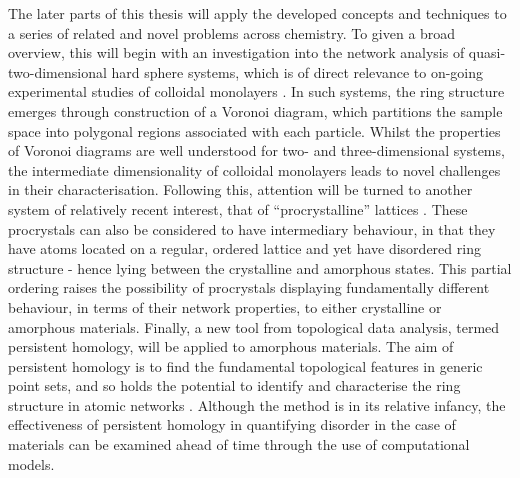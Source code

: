 The later parts of this thesis will apply the developed concepts and techniques to a series of related and novel problems across chemistry.
To given a broad overview, this will begin with an investigation into the network analysis of quasi\--two\--dimensional hard sphere systems, which is of direct relevance to on\--going experimental studies of colloidal monolayers \cite{Thorneywork2017}.
In such systems, the ring structure emerges through construction of a Voronoi diagram, which partitions the sample space into polygonal regions associated with each particle.
Whilst the properties of Voronoi diagrams are well understood for two\-- and three\--dimensional systems, the intermediate dimensionality of colloidal monolayers leads to novel challenges in their characterisation.
Following this, attention will be turned to another system of relatively recent interest, that of ``procrystalline'' lattices \cite{Overy2016}.
These procrystals can also be considered to have intermediary behaviour, in that they have atoms located on a regular, ordered lattice and yet have disordered ring structure - hence lying between the crystalline and amorphous states.
This partial ordering raises the possibility of procrystals displaying fundamentally different behaviour, in terms of their network properties, to either crystalline or amorphous materials.
Finally, a new tool from topological data analysis, termed persistent homology, will be applied to \td{} amorphous materials.
The aim of persistent homology is to find the fundamental topological features in generic point sets, and so holds the potential to identify and characterise the ring structure in atomic networks \cite{Wasserman2018}.
Although the method is in its relative infancy, the effectiveness of persistent homology in quantifying disorder in the case of \td{} materials can be examined ahead of time through the use of computational models.


